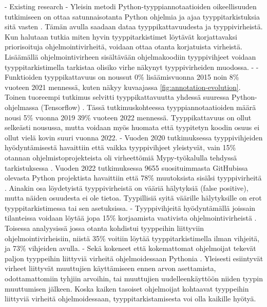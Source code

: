 \begin{otherlanguage}{finnish}
- Existing research
    - Yleisin metodi Python-tyyppiannotaatioiden oikeellisuuden tutkimiseen on ottaa satunnaisotanta Python ohjelmia ja ajaa tyyppitarkistuksia sitä vasten \cite{di_grazia_evolution_2022, lin_towards_large_scale_2023, rak-amnouykit_taleoftwo_2020, xu_how_well_static_2023}. Tämän avulla saadaan dataa tyyppikattavuudesta ja tyyppivirheistä. Kun halutaan tutkia miten hyvin tyyppitarkistimet löytävät korjattavaksi priorisoituja ohjelmointivirheitä, voidaan ottaa otanta korjatuista virheistä. Lisäämällä ohjelmointivirheen sisältävään ohjelmakoodiin tyyppivihjeet voidaan tyyppitarkistimella tarkistaa olisiko virhe näkynyt tyyppivirheiden muodossa.
    - %
    - Funktioiden tyyppikattavuus on noussut 0\% lisäämisvuonna 2015 noin 8\% vuoteen 2021 mennessä, kuten näkyy kuvaajassa \ref{fig:annotation-evolution}. Toinen tuoreempi tutkimus selvitti tyyppikattavuutta yhdessä suuressa Python-ohjelmassa (Tensorflow) \cite{lin_towards_large_scale_2023}. Tässä tutkimuskohteessa tyyppiannotaatioiden määrä nousi 5\% vuonna 2019 39\% vuoteen 2022 mennessä. Tyyppikattavuus on ollut selkeästi nousussa, mutta voidaan myös huomata että tyypitetyn koodin osuus ei ollut vielä kovin suuri vuonna 2022.
    - Vuoden 2020 tutkimuksessa tyyppivihjeiden hyödyntämisestä havaittiin että vaikka tyyppivihjeet yleistyvät, vain 15\% otannan ohjelmistoprojekteista oli virheettömiä Mypy-työkalulla tehdyssä tarkistuksessa \cite{rak-amnouykit_taleoftwo_2020}. Vuoden 2022 tutkimuksessa 9655 suosituimmasta GitHubissa olevasta Python projektista havaittiin että 78\% muutoksista sisälsi tyyppivirheitä \cite{di_grazia_evolution_2022}. Ainakin osa löydetyistä tyyppivirheistä on vääriä hälytyksiä (false positive), mutta näiden osuudesta ei ole tietoa. Tyypillisiä syitä väärille hälytyksille on erot tyyppitarkistimessa tai sen asetuksissa.
    - Tyyppivihjeitä hyödyntämällä joissain tilanteissa voidaan löytää jopa 15\% korjaamista vaativista ohjelmointivirheistä \cite{khan_empirical_2022}. Toisessa analyysissä jossa otanta kohdistui tyyppeihin liittyviin ohjelmointivirheisiin, niistä 35\% voitiin löytää tyyppitarkistimella ilman vihjeitä, ja 73\% vihjeiden avulla.
    - Sekä kokeneet että kokemattomat ohjelmoijat tekevät paljon tyyppeihin liittyviä virheitä ohjelmoidessaan Pythonia \cite{khan_empirical_2022}. Yleisesti esiintyvät virheet liittyvät muuttujien käyttämiseen ennen arvon asettamista, odottamattomiin tyhjiin arvoihin, tai muuttujien uudelleenkäyttöön niiden tyypin muuttumisen jälkeen. Koska kaiken tasoiset ohjelmoijat kohtaavat tyyppeihin liittyviä virheitä ohjelmoidessaan, tyyppitarkistamisesta voi olla kaikille hyötyä.


\end{otherlanguage}
